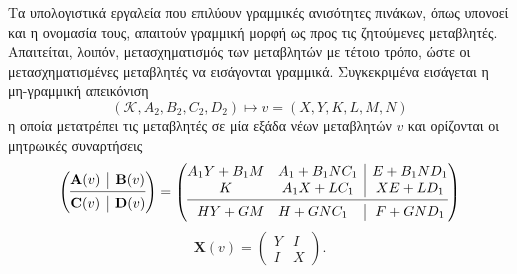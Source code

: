 Τα υπολογιστικά εργαλεία που επιλύουν γραμμικές ανισότητες πινάκων, όπως 
υπονοεί και η ονομασία τους, απαιτούν γραμμική μορφή ως προς τις ζητούμενες 
μεταβλητές. Απαιτείται, λοιπόν, μετασχηματισμός των μεταβλητών με τέτοιο τρόπο, ώστε οι 
μετασχηματισμένες μεταβλητές να εισάγονται γραμμικά. Συγκεκριμένα εισάγεται η 
μη-γραμμική απεικόνιση 
\begin{equation*}
    (\mathcal{K}, A_2, B_2, C_2, D_2) \mapsto v = (X, Y, K, L, M, N)
\end{equation*}
η οποία μετατρέπει τις μεταβλητές σε μία εξάδα νέων μεταβλητών $v$ και ορίζονται 
οι μητρωικές συναρτήσεις 
\begin{equation*}
    \begin{pmatrix}
        \begin{array}{@{}c|c@{}}
            \mathbf{A}(v) & 
            \mathbf{B}(v) \\
            \cmidrule[0.4pt]{1-2}
            \mathbf{C}(v) & 
            \mathbf{D}(v) \\
        \end{array} 
    \end{pmatrix} = 
    \begin{pmatrix}
        \begin{array}{@{}c|c@{}}
            \begin{matrix}
                A_1 Y + B_1 M   & A_1 + B_1 N C_1\\
                K               & A_1 X + L C_1
            \end{matrix} & 
            \begin{matrix}
                E + B_1 N D_1\\
                X E + L D_1
            \end{matrix} \\
            \cmidrule[0.4pt]{1-2}
            \begin{matrix}
                H Y + G M & H + G N C_1
            \end{matrix} & 
            \begin{matrix}
                F + G N D_1
            \end{matrix} \\
        \end{array} 
    \end{pmatrix}
\end{equation*}
\begin{equation*}
    \mathbf{X}(v) = 
    \begin{pmatrix}
        Y & I \\
        I & X
    \end{pmatrix}.
\end{equation*}

